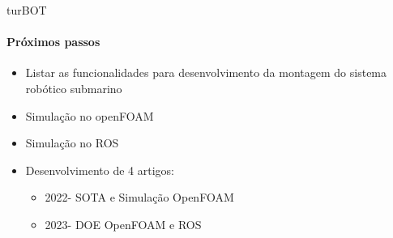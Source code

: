 \begin{frame}[t]{turBOT}
    \framesubtitle{Próximos passos}
    \begin{itemize}
        \item Listar as funcionalidades para desenvolvimento da montagem do sistema robótico submarino
        \item Simulação no openFOAM
        \item Simulação no ROS
        \item Desenvolvimento de 4 artigos: 
        \begin{itemize}
            \item[] 2022- SOTA e Simulação OpenFOAM
            \item[] 2023- DOE OpenFOAM e ROS 
        \end{itemize}  
        
    \end{itemize}    
\end{frame}
